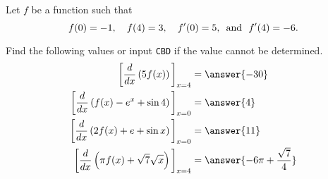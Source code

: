 \documentclass{ximera}
\author{Nela Lakos \and Kyle Parsons}
\begin{document}
\begin{exercise}

Let $f$ be a function such that
\[
f(0) = -1,\quad f(4) = 3,\quad f'(0) = 5\text{, \phantom{} and \phantom{} }f'(4) = -6.
\]

Find the following values or input \verb|CBD| if the value cannot be determined.
\begin{align*}
\eval{\ddx\left(5f(x)\right)}_{x=4} &= \answer{-30}\\
\eval{\ddx\left(f(x) - e^x + \sin 4\right)}_{x=0} &= \answer{4}\\
\eval{\ddx\left(2f(x) + e + \sin x\right)}_{x=0} &= \answer{11}\\
\eval{\ddx\left(\pi f(x) + \sqrt{7}\sqrt{x}\right)}_{x=4} &= \answer{-6\pi + \frac{\sqrt{7}}{4}}
\end{align*}

\end{exercise}
\end{document}
